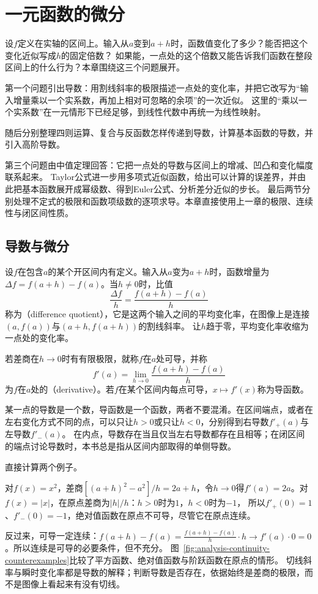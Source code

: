\chapter{一元函数的微分}
\label{chap:univariate-differentiation}
\label{chap:continuous-functions}

设$f$定义在实轴的区间上。输入从$a$变到$a+h$时，函数值变化了多少？能否把这个变化近似写成$h$的固定倍数？
如果能，一点处的这个倍数又能告诉我们函数在整段区间上的什么行为？本章围绕这三个问题展开。

第一个问题引出导数：用割线斜率的极限描述一点处的变化率，并把它改写为“输入增量乘以一个实系数，再加上相对可忽略的余项”的一次近似。
这里的“乘以一个实系数”在一元情形下已经足够，到线性代数中再统一为线性映射。

随后分别整理四则运算、复合与反函数怎样传递到导数，计算基本函数的导数，并引入高阶导数。

第三个问题由中值定理回答：它把一点处的导数与区间上的增减、凹凸和变化幅度联系起来。
Taylor公式进一步用多项式近似函数，给出可以计算的误差界，并由此把基本函数展开成幂级数、得到Euler公式、分析差分近似的步长。
最后两节分别处理不定式的极限和函数项级数的逐项求导。本章直接使用上一章的极限、连续性与闭区间性质。

\section{导数与微分}
\label{sec:ru-derivatives}
\label{sec:analysis-derivatives-linear-approximation}

设$f$在包含$a$的某个开区间内有定义。输入从$a$变为$a+h$时，函数增量为$\Delta f=f(a+h)-f(a)$。当$h\neq0$时，比值
\[
 \frac{\Delta f}{h}=\frac{f(a+h)-f(a)}h
\]
称为（difference quotient），它是这两个输入之间的平均变化率，在图像上是连接$(a,f(a))$与$(a+h,f(a+h))$的割线斜率。
让$h$趋于零，平均变化率收缩为一点处的变化率。

\begin{definition}[导数]
\label{def:ru-derivative}
若差商在$h\to0$时有有限极限，就称$f$在$a$处可导，并称
\[
 f'(a)=\lim_{h\to0}\frac{f(a+h)-f(a)}h
\]
为$f$在$a$处的（derivative）。若$f$在某个区间内每点可导，$x\mapsto f'(x)$称为导函数。
\end{definition}
某一点的导数是一个数，导函数是一个函数，两者不要混淆。在区间端点，或者在左右变化方式不同的点，可以只让$h>0$或只让$h<0$，分别得到右导数$f'_+(a)$与左导数$f'_-(a)$。
在内点，导数存在当且仅当左右导数都存在且相等；在闭区间的端点讨论导数时，本书总是指从区间内部取得的单侧导数。

直接计算两个例子。
\begin{example}[平方函数与绝对值函数的导数]
\label{ex:ru-square-abs-derivative}
对$f(x)=x^2$，差商$[(a+h)^2-a^2]/h=2a+h$，令$h\to0$得$f'(a)=2a$。对$f(x)=|x|$，在原点差商为$|h|/h$：$h>0$时为$1$，$h<0$时为$-1$，
所以$f'_+(0)=1$、$f'_-(0)=-1$，绝对值函数在原点不可导，尽管它在原点连续。
\end{example}
反过来，可导一定连续：$f(a+h)-f(a)=\frac{f(a+h)-f(a)}h\cdot h\to f'(a)\cdot0=0$。所以连续是可导的必要条件，但不充分。
图~\ref{fig:analysis-continuity-counterexamples}比较了平方函数、绝对值函数与阶跃函数在原点的情形。
切线斜率与瞬时变化率都是导数的解释；判断导数是否存在，依据始终是差商的极限，而不是图像上看起来有没有切线。


